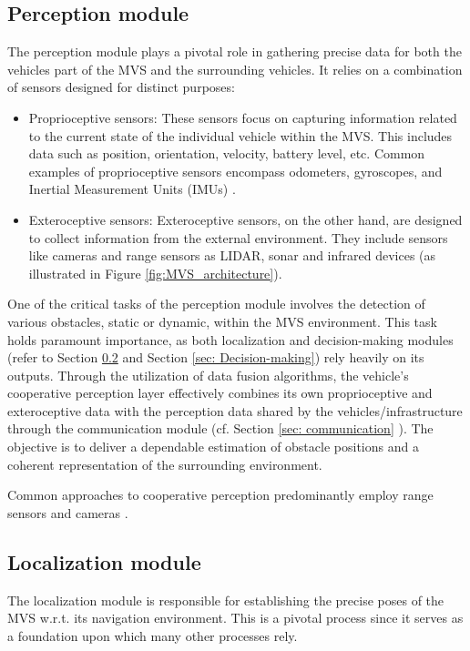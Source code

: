 \subsection{Perception module} \label{sec: perception} 
The perception module plays a pivotal role in gathering precise data for both the vehicles part of the MVS and the surrounding vehicles. It relies on a combination of sensors designed for distinct purposes: 
        \begin{itemize}
         \item Proprioceptive sensors: These sensors focus on capturing information related to the current state of the individual vehicle within the MVS. This includes data such as position, orientation, velocity, battery level, etc. Common examples of proprioceptive sensors encompass odometers, gyroscopes, and Inertial Measurement Units (IMUs) .
         \item Exteroceptive sensors: Exteroceptive sensors, on the other hand, are designed to collect information from the external environment. They include sensors like cameras and range sensors as LIDAR, sonar and infrared devices (as illustrated in Figure \ref{fig:MVS_architecture}).
           \end{itemize}

    One of the critical tasks of the perception module involves the detection of various obstacles, static or dynamic, within the MVS environment. This task holds paramount importance, as both localization and decision-making modules (refer to Section \ref{sec: localization} and Section \ref{sec: Decision-making}) rely heavily on its outputs. Through the utilization of data fusion algorithms, the vehicle's cooperative perception layer effectively combines its own proprioceptive and exteroceptive data with the perception data shared by the vehicles/infrastructure through the communication module (cf. Section \ref{sec: communication} ). The objective is to deliver a dependable estimation of obstacle positions and a coherent representation of the surrounding environment. 

    Common approaches to cooperative perception predominantly employ range sensors and cameras  \cite{rauch2012car2x} \cite{kim2015impact}. 





   \subsection{Localization module}  \label{sec: localization} 
   The localization module is responsible for establishing the precise poses of the MVS w.r.t. its navigation environment. This is a pivotal process since it serves as a foundation upon which many other processes rely.
   
